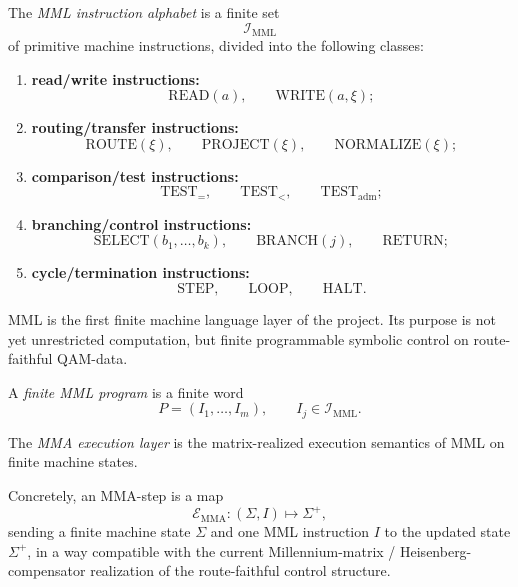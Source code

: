 \begin{definition}\label{def:mml-instruction-alphabet-computational-layer}
The \emph{MML instruction alphabet} is a finite set
\[
\mathcal{I}_{\mathrm{MML}}
\]
of primitive machine instructions, divided into the following classes:
\begin{enumerate}[leftmargin=2em]
    \item \textbf{read/write instructions:}
    \[
    \mathrm{READ}(a),\qquad \mathrm{WRITE}(a,\xi);
    \]
    \item \textbf{routing/transfer instructions:}
    \[
    \mathrm{ROUTE}(\xi),\qquad \mathrm{PROJECT}(\xi),\qquad \mathrm{NORMALIZE}(\xi);
    \]
    \item \textbf{comparison/test instructions:}
    \[
    \mathrm{TEST}_{=},\qquad \mathrm{TEST}_{<},\qquad \mathrm{TEST}_{\mathrm{adm}};
    \]
    \item \textbf{branching/control instructions:}
    \[
    \mathrm{SELECT}(b_1,\dots,b_k),\qquad \mathrm{BRANCH}(j),\qquad \mathrm{RETURN};
    \]
    \item \textbf{cycle/termination instructions:}
    \[
    \mathrm{STEP},\qquad \mathrm{LOOP},\qquad \mathrm{HALT}.
    \]
\end{enumerate}
\end{definition}

\begin{remark}\label{rem:mml-as-finite-machine-language-computational-layer}
MML is the first finite machine language layer of the project. Its purpose is not yet unrestricted computation, but finite programmable symbolic control on route-faithful QAM-data.
\end{remark}

\begin{definition}\label{def:finite-mml-program-computational-layer}
A \emph{finite MML program} is a finite word
\[
P=(I_1,\dots,I_m),\qquad I_j\in\mathcal{I}_{\mathrm{MML}}.
\]
\end{definition}

\begin{definition}\label{def:mma-execution-layer-computational-layer}
The \emph{MMA execution layer} is the matrix-realized execution semantics of MML on finite machine states.

Concretely, an MMA-step is a map
\[
\mathcal{E}_{\mathrm{MMA}}:(\Sigma,I)\longmapsto \Sigma^{+},
\]
sending a finite machine state \(\Sigma\) and one MML instruction \(I\) to the updated state \(\Sigma^{+}\), in a way compatible with the current Millennium-matrix / Heisenberg-compensator realization of the route-faithful control structure.
\end{definition}


